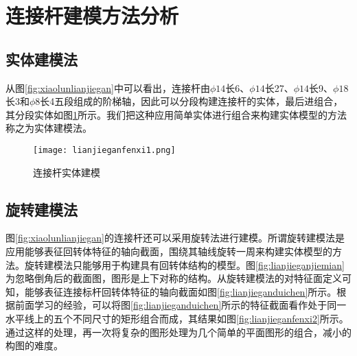 \section{连接杆建模方法分析}\label{sec:lianjieganfenxi}
\subsection{实体建模法}
从图\ref{fig:xiaolunlianjiegan}中可以看出，连接杆由$\phi 14$长6、$\phi 14$长27、$\phi 14$长9、$\phi 18$长3和$\phi 8$长4五段组成的阶梯轴，因此可以分段构建连接杆的实体，最后进组合，其分段实体如图\ref{fig:lianjieganfenxi1}所示。我们把这种应用简单实体进行组合来构建实体模型的方法称之为实体建模法。

\begin{figure}[htbp]
\centering
\texttt{[image: lianjieganfenxi1.png]}
\caption{连接杆实体建模}\label{fig:lianjieganfenxi1}
\end{figure}
\subsection{旋转建模法}
图\ref{fig:xiaolunlianjiegan}的连接杆还可以采用旋转法进行建模。所谓旋转建模法是应用能够表征回转体特征的轴向截面，围绕其轴线旋转一周来构建实体模型的方法。旋转建模法只能够用于构建具有回转体结构的模型。图\ref{fig:lianjieganjiemian}为忽略倒角后的截面图，图形是上下对称的结构。从旋转建模法的对特征面定义可知，能够表征连接标杆回转体特征的轴向截面如图\ref{fig:lianjieganduichen}所示。根据前面学习的经验，可以将图\ref{fig:lianjieganduichen}所示的特征截面看作处于同一水平线上的五个不同尺寸的矩形组合而成，其结果如图\ref{fig:lianjieganfenxi2}所示。通过这样的处理，再一次将复杂的图形处理为几个简单的平面图形的组合，减小的构图的难度。
\begin{figure}[htbp]
\begin{floatrow}[3]
\end{floatrow}
\end{figure}

\endinput